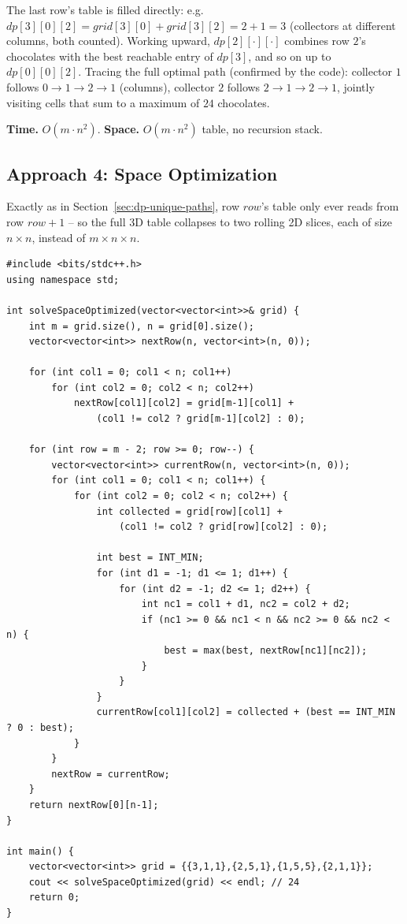 The last row's table is filled directly: e.g.\
$\textit{dp}[3][0][2] = \textit{grid}[3][0]+\textit{grid}[3][2] =
2+1=3$ (collectors at different columns, both counted). Working
upward, $\textit{dp}[2][\cdot][\cdot]$ combines row $2$'s chocolates
with the best reachable entry of $\textit{dp}[3]$, and so on up to
$\textit{dp}[0][0][2]$. Tracing the full optimal path (confirmed by the
code): collector $1$ follows $0\to1\to2\to1$ (columns), collector $2$
follows $2\to1\to2\to1$, jointly visiting cells that sum to a maximum
of $\boxed{24}$ chocolates.

\begin{complexitybox}
\textbf{Time.} $O(m \cdot n^2)$.
\textbf{Space.} $O(m \cdot n^2)$ table, no recursion stack.
\end{complexitybox}

\subsection*{Approach 4: Space Optimization}

\begin{ideabox}
Exactly as in Section~\ref{sec:dp-unique-paths}, row $\textit{row}$'s
table only ever reads from row $\textit{row}+1$ -- so the full 3D table
collapses to two rolling 2D slices, each of size $n \times n$, instead of
$m \times n \times n$.
\end{ideabox}

\begin{lstlisting}
#include <bits/stdc++.h>
using namespace std;

int solveSpaceOptimized(vector<vector<int>>& grid) {
    int m = grid.size(), n = grid[0].size();
    vector<vector<int>> nextRow(n, vector<int>(n, 0));

    for (int col1 = 0; col1 < n; col1++)
        for (int col2 = 0; col2 < n; col2++)
            nextRow[col1][col2] = grid[m-1][col1] +
                (col1 != col2 ? grid[m-1][col2] : 0);

    for (int row = m - 2; row >= 0; row--) {
        vector<vector<int>> currentRow(n, vector<int>(n, 0));
        for (int col1 = 0; col1 < n; col1++) {
            for (int col2 = 0; col2 < n; col2++) {
                int collected = grid[row][col1] +
                    (col1 != col2 ? grid[row][col2] : 0);

                int best = INT_MIN;
                for (int d1 = -1; d1 <= 1; d1++) {
                    for (int d2 = -1; d2 <= 1; d2++) {
                        int nc1 = col1 + d1, nc2 = col2 + d2;
                        if (nc1 >= 0 && nc1 < n && nc2 >= 0 && nc2 < n) {
                            best = max(best, nextRow[nc1][nc2]);
                        }
                    }
                }
                currentRow[col1][col2] = collected + (best == INT_MIN ? 0 : best);
            }
        }
        nextRow = currentRow;
    }
    return nextRow[0][n-1];
}

int main() {
    vector<vector<int>> grid = {{3,1,1},{2,5,1},{1,5,5},{2,1,1}};
    cout << solveSpaceOptimized(grid) << endl; // 24
    return 0;
}
\end{lstlisting}

